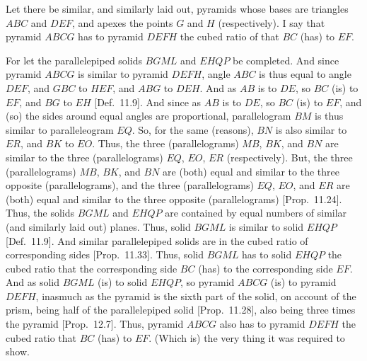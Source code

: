 \begin{Parallel}{}{}
{Let there be similar, and similarly laid out, pyramids whose bases are triangles $ABC$ and $DEF$, and apexes
the points $G$ and $H$ (respectively). I say that pyramid $ABCG$ has to pyramid $DEFH$ the cubed ratio
of that $BC$ (has) to $EF$. 

\centerline{}

For let the parallelepiped solids $BGML$ and $EHQP$ be completed. And since pyramid $ABCG$
is similar to pyramid $DEFH$, angle $ABC$ is thus equal to angle $DEF$, and $GBC$ to $HEF$, and $ABG$
to $DEH$. And as $AB$ is to $DE$, so $BC$ (is) to $EF$, and $BG$ to $EH$ [Def.~11.9]. 
And since as $AB$ is to $DE$, so $BC$ (is) to $EF$, and (so) the sides around equal angles are proportional, parallelogram
$BM$ is thus similar to paralleleogram $EQ$. So, for the same (reasons), $BN$ is also similar to $ER$, and $BK$
to $EO$. Thus, the three (parallelograms) $MB$, $BK$, and $BN$ are similar to the three (parallelograms) $EQ$, $EO$,
$ER$ (respectively). But, the three (parallelograms) $MB$, $BK$, and $BN$ are (both) equal and similar to the three  opposite (parallelograms),
and the three (parallelograms) $EQ$, $EO$, and $ER$ are (both) equal and similar to the three opposite
 (parallelograms) [Prop.~11.24]. Thus, the solids $BGML$ and $EHQP$ are contained by
 equal numbers of similar (and similarly laid out) planes. Thus, solid $BGML$ is similar to solid $EHQP$ [Def.~11.9].
 And similar parallelepiped solids are in the cubed ratio of corresponding sides [Prop.~11.33].
 Thus, solid $BGML$ has to solid $EHQP$ the cubed ratio that the corresponding side $BC$ (has) to the corresponding
 side $EF$. And as solid $BGML$ (is) to solid $EHQP$, so pyramid $ABCG$ (is) to pyramid
 $DEFH$, inasmuch as the pyramid is the sixth part of the solid, on account of the prism, being half of the
 parallelepiped solid [Prop.~11.28], also being three times the pyramid [Prop.~12.7].
 Thus, pyramid $ABCG$ also has to pyramid $DEFH$ the cubed ratio that $BC$ (has) to $EF$. (Which is)
 the very thing it was required to show.}
 \end{Parallel}

